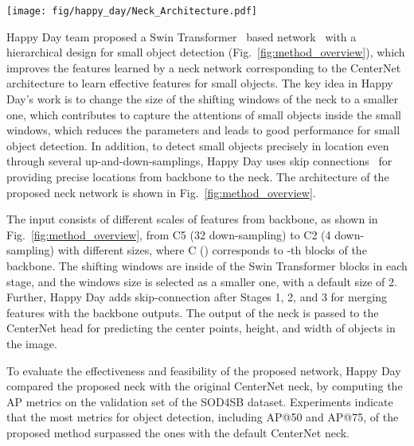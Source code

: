 \documentclass{mva_style}
\begin{document}
\begin{figure*}[t]
  \begin{center}
    \texttt{[image: fig/happy\_day/Neck\_Architecture.pdf]}
  \end{center}
  \vspace{-1.5em}
  \caption{Happy Day team proposed neck network~\cite{happy_day_mva2023}, the windows size 2 was used in each Swin Transformer Block, and Up Merging~\cite{shi2016real} Module upsamples features and merges with those extracted in the backbone to effectively
recognize object features in SOD.}
\vspace{-0.8em}
  \label{fig:method_overview}
\end{figure*}

Happy Day team proposed a Swin Transformer~\cite{liu2021swin} based network~\cite{happy_day_mva2023} with a hierarchical design for small object detection (Fig.~\ref{fig:method_overview}), which improves the features learned by a neck network corresponding to the CenterNet~\cite{zhou2019objects} architecture to learn effective features for small objects. The key idea in Happy Day's work is to change the size of the shifting windows of the neck to a smaller one, which contributes to capture the attentions of small objects inside the small windows, which reduces the parameters and leads to good performance for small object detection. In addition, to detect small objects precisely in location even through several up-and-down-samplings, Happy Day uses skip connections~\cite{ronneberger2015u} for providing precise locations from backbone to the neck. 
The architecture of the proposed neck network is shown in Fig.~\ref{fig:method_overview}.

The input consists of different scales of features from backbone, as shown in Fig.~\ref{fig:method_overview}, from C5 (32{} down-sampling) to C2 (4{} down-sampling) with different sizes, where C () corresponds to -th blocks of the backbone. The shifting windows are inside of the Swin Transformer blocks in each stage, and the windows size is selected as a smaller one, with a default size of 2. Further, Happy Day adds skip-connection after Stages 1, 2, and 3 for merging features with the backbone outputs. The output of the neck is passed to the CenterNet head for predicting the center points, height, and width of objects in the image.

To evaluate the effectiveness and feasibility of the proposed network, Happy Day compared the proposed neck with the original CenterNet neck, by computing the AP metrics on the validation set of the SOD4SB dataset. Experiments indicate that the most metrics for object detection, including AP@50 and AP@75, of the proposed method surpassed the ones with the default CenterNet neck.
\end{document}
